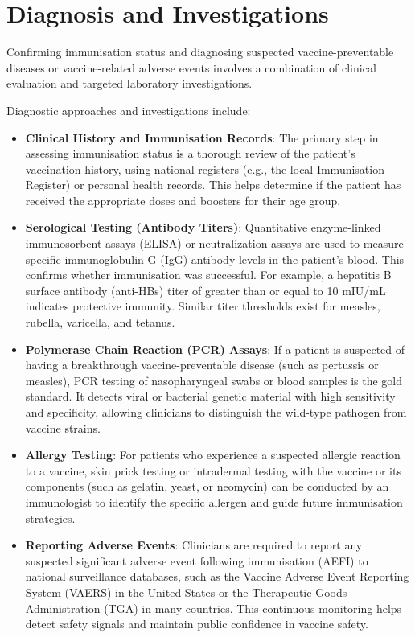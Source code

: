 \section*{Diagnosis and Investigations}
Confirming immunisation status and diagnosing suspected vaccine-preventable diseases or vaccine-related adverse events involves a combination of clinical evaluation and targeted laboratory investigations.

Diagnostic approaches and investigations include:
\begin{itemize}
    \item \textbf{Clinical History and Immunisation Records}: The primary step in assessing immunisation status is a thorough review of the patient's vaccination history, using national registers (e.g., the local Immunisation Register) or personal health records. This helps determine if the patient has received the appropriate doses and boosters for their age group.
    \item \textbf{Serological Testing (Antibody Titers)}: Quantitative enzyme-linked immunosorbent assays (ELISA) or neutralization assays are used to measure specific immunoglobulin G (IgG) antibody levels in the patient's blood. This confirms whether immunisation was successful. For example, a hepatitis B surface antibody (anti-HBs) titer of greater than or equal to 10 mIU/mL indicates protective immunity. Similar titer thresholds exist for measles, rubella, varicella, and tetanus.
    \item \textbf{Polymerase Chain Reaction (PCR) Assays}: If a patient is suspected of having a breakthrough vaccine-preventable disease (such as pertussis or measles), PCR testing of nasopharyngeal swabs or blood samples is the gold standard. It detects viral or bacterial genetic material with high sensitivity and specificity, allowing clinicians to distinguish the wild-type pathogen from vaccine strains.
    \item \textbf{Allergy Testing}: For patients who experience a suspected allergic reaction to a vaccine, skin prick testing or intradermal testing with the vaccine or its components (such as gelatin, yeast, or neomycin) can be conducted by an immunologist to identify the specific allergen and guide future immunisation strategies.
    \item \textbf{Reporting Adverse Events}: Clinicians are required to report any suspected significant adverse event following immunisation (AEFI) to national surveillance databases, such as the Vaccine Adverse Event Reporting System (VAERS) in the United States or the Therapeutic Goods Administration (TGA) in many countries. This continuous monitoring helps detect safety signals and maintain public confidence in vaccine safety.
\end{itemize}

